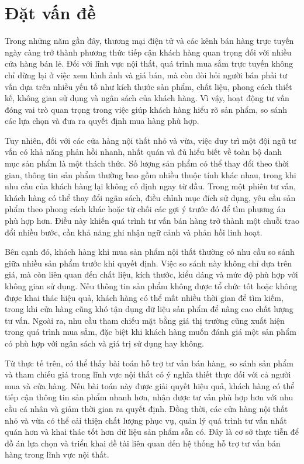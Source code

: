 \documentclass[../DoAn.tex]{subfiles}
\begin{document}
\section{Đặt vấn đề}
\label{section:1.1}
Trong những năm gần đây, thương mại điện tử và các kênh bán hàng trực tuyến ngày càng trở thành phương thức tiếp cận khách hàng quan trọng đối với nhiều cửa hàng bán lẻ. Đối với lĩnh vực nội thất, quá trình mua sắm trực tuyến không chỉ dừng lại ở việc xem hình ảnh và giá bán, mà còn đòi hỏi người bán phải tư vấn dựa trên nhiều yếu tố như kích thước sản phẩm, chất liệu, phong cách thiết kế, không gian sử dụng và ngân sách của khách hàng. Vì vậy, hoạt động tư vấn đóng vai trò quan trọng trong việc giúp khách hàng hiểu rõ sản phẩm, so sánh các lựa chọn và đưa ra quyết định mua hàng phù hợp.

Tuy nhiên, đối với các cửa hàng nội thất nhỏ và vừa, việc duy trì một đội ngũ tư vấn có khả năng phản hồi nhanh, nhất quán và đủ hiểu biết về toàn bộ danh mục sản phẩm là một thách thức. Số lượng sản phẩm có thể thay đổi theo thời gian, thông tin sản phẩm thường bao gồm nhiều thuộc tính khác nhau, trong khi nhu cầu của khách hàng lại không cố định ngay từ đầu. Trong một phiên tư vấn, khách hàng có thể thay đổi ngân sách, điều chỉnh mục đích sử dụng, yêu cầu sản phẩm theo phong cách khác hoặc từ chối các gợi ý trước đó để tìm phương án phù hợp hơn. Điều này khiến quá trình tư vấn bán hàng trở thành một chuỗi trao đổi nhiều bước, cần khả năng ghi nhận ngữ cảnh và phản hồi linh hoạt.

Bên cạnh đó, khách hàng khi mua sản phẩm nội thất thường có nhu cầu so sánh giữa nhiều sản phẩm trước khi quyết định. Việc so sánh này không chỉ dựa trên giá, mà còn liên quan đến chất liệu, kích thước, kiểu dáng và mức độ phù hợp với không gian sử dụng. Nếu thông tin sản phẩm không được tổ chức tốt hoặc không được khai thác hiệu quả, khách hàng có thể mất nhiều thời gian để tìm kiếm, trong khi cửa hàng cũng khó tận dụng dữ liệu sản phẩm để nâng cao chất lượng tư vấn. Ngoài ra, nhu cầu tham chiếu mặt bằng giá thị trường cũng xuất hiện trong quá trình mua sắm, đặc biệt khi khách hàng muốn đánh giá một sản phẩm có phù hợp với ngân sách và giá trị sử dụng hay không.

Từ thực tế trên, có thể thấy bài toán hỗ trợ tư vấn bán hàng, so sánh sản phẩm và tham chiếu giá trong lĩnh vực nội thất có ý nghĩa thiết thực đối với cả người mua và cửa hàng. Nếu bài toán này được giải quyết hiệu quả, khách hàng có thể tiếp cận thông tin sản phẩm nhanh hơn, nhận được tư vấn phù hợp hơn với nhu cầu cá nhân và giảm thời gian ra quyết định. Đồng thời, các cửa hàng nội thất nhỏ và vừa có thể cải thiện chất lượng phục vụ, quản lý quá trình tư vấn nhất quán hơn và khai thác tốt hơn dữ liệu sản phẩm sẵn có. Đây là cơ sở thực tiễn để đồ án lựa chọn và triển khai đề tài liên quan đến hệ thống hỗ trợ tư vấn bán hàng trong lĩnh vực nội thất.
\end{document}
